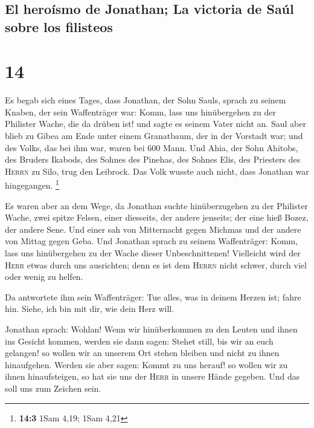 \hypertarget{el-herouxedsmo-de-jonathan-la-victoria-de-sauxfal-sobre-los-filisteos}{%
\subsection{El heroísmo de Jonathan; La victoria de Saúl sobre los
filisteos}\label{el-herouxedsmo-de-jonathan-la-victoria-de-sauxfal-sobre-los-filisteos}}

\hypertarget{section-13}{%
\section{14}\label{section-13}}

 Es begab sich eines Tages, dass Jonathan, der Sohn Sauls,
sprach zu seinem Knaben, der sein Waffenträger war: Komm, lass uns
hinübergehen zu der Philister Wache, die da drüben ist! und sagte es
seinem Vater nicht an.  Saul aber blieb zu Gibea am Ende
unter einem Granatbaum, der in der Vorstadt war; und des Volks, das bei
ihm war, waren bei 600 Mann.  Und Ahia, der Sohn Ahitobs,
des Bruders Ikabods, des Sohnes des Pinehas, des Sohnes Elis, des
Priesters des \textsc{Herrn} zu Silo, trug den Leibrock. Das Volk wusste
auch nicht, dass Jonathan war hingegangen. \footnote{\textbf{14:3} 1Sam
  4,19; 1Sam 4,21}

 Es waren aber an dem Wege, da Jonathan suchte
hinüberzugehen zu der Philister Wache, zwei spitze Felsen, einer
diesseits, der andere jenseits; der eine hieß Bozez, der andere Sene.
 Und einer sah von Mitternacht gegen Michmas und der
andere von Mittag gegen Geba.  Und Jonathan sprach zu
seinem Waffenträger: Komm, lass uns hinübergehen zu der Wache dieser
Unbeschnittenen! Vielleicht wird der \textsc{Herr} etwas durch uns
ausrichten; denn es ist dem \textsc{Herrn} nicht schwer, durch viel oder
wenig zu helfen.

 Da antwortete ihm sein Waffenträger: Tue alles, was in
deinem Herzen ist; fahre hin. Siehe, ich bin mit dir, wie dein Herz
will.

 Jonathan sprach: Wohlan! Wenn wir hinüberkommen zu den
Leuten und ihnen ins Gesicht kommen,  werden sie dann
sagen: Stehet still, bis wir an euch gelangen! so wollen wir an unserem
Ort stehen bleiben und nicht zu ihnen hinaufgehen. 
Werden sie aber sagen: Kommt zu uns herauf! so wollen wir zu ihnen
hinaufsteigen, so hat sie uns der \textsc{Herr} in unsere Hände gegeben.
Und das soll uns zum Zeichen sein.

